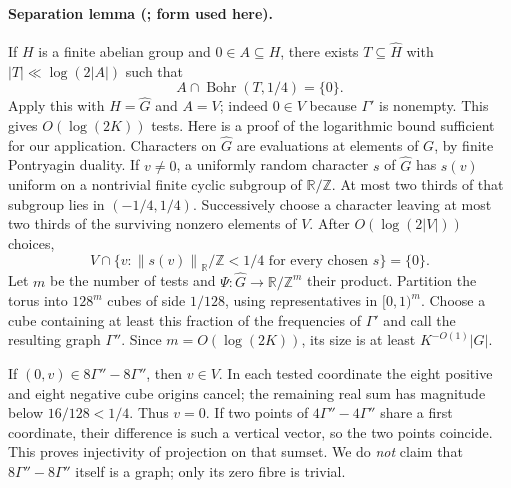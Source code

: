 \documentclass[11pt,a4paper]{article}
\newcommand{\T}{\mathbb R/\mathbb Z}
\newcommand{\Gh}{\widehat G}
\newcommand{\Bohr}{\operatorname{Bohr}}
\newcommand{\norm}[1]{\left\|#1\right\|}
\newcommand{\GT}[1]{\cite[#1]{GT}}
\theoremstyle{definition}
\numberwithin{equation}{section}
\begin{document}
\paragraph{Separation lemma (\GT{Lemma 8.3}; form used here).}
If $H$ is a finite abelian group and $0\in A\subseteq H$, there exists
$T\subseteq\widehat H$ with $|T|\ll\log(2|A|)$ such that
\[A\cap\Bohr(T,1/4)=\{0\}.\]
Apply this with $H=\Gh$ and $A=V$; indeed $0\in V$ because $\Gamma'$
is nonempty. This gives $O(\log(2K))$ tests. Here is a proof of the
logarithmic bound sufficient for our application.
Characters on $\Gh$ are evaluations at elements of $G$, by finite
Pontryagin duality. If $v\ne0$, a uniformly random character $s$ of
$\Gh$ has $s(v)$ uniform on a nontrivial finite cyclic subgroup of
$\T$. At most two thirds of that subgroup lies in $(-1/4,1/4)$.
Successively choose a character leaving at most two thirds of the surviving
nonzero elements of $V$. After $O(\log(2|V|))$ choices,
\[V\cap\{v:\norm{s(v)}_\T<1/4\text{ for every chosen }s\}=\{0\}.\]
Let $m$ be the number of tests and $\Psi:\Gh\to\T^m$ their product.
Partition the torus into $128^m$ cubes of side $1/128$, using
representatives in $[0,1)^m$. Choose a cube containing at least this
fraction of the frequencies of $\Gamma'$ and call the resulting graph
$\Gamma''$. Since $m=O(\log(2K))$, its size is at least
$K^{-O(1)}|G|$.

If $(0,v)\in8\Gamma''-8\Gamma''$, then $v\in V$. In each tested
coordinate the eight positive and eight negative cube origins cancel;
the remaining real sum has magnitude below $16/128<1/4$.
Thus $v=0$. If two points of $4\Gamma''-4\Gamma''$ share a first
coordinate, their difference is such a vertical vector, so the two
points coincide. This proves injectivity of projection on that sumset.
We do \emph{not} claim that $8\Gamma''-8\Gamma''$ itself is a graph;
only its zero fibre is trivial.
\end{document}
